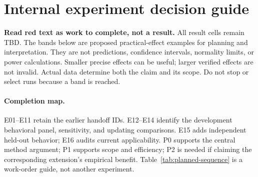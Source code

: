\begingroup
\expcolor
\raggedbottom
\section{Internal experiment decision guide}
\label{sec:experiment-decisions}
\textbf{Read red text as work to complete, not a result.}
All result cells remain TBD. The bands below are proposed practical-effect
examples for planning and interpretation. They are not predictions, confidence
intervals, normality limits, or power calculations. Smaller precise effects
can be useful; larger verified effects are not invalid. Actual data determine
both the claim and its scope. Do not stop or select runs because a band is reached.

\paragraph{Completion map.}
E01--E11 retain the earlier handoff IDs. E12--E14 identify the development
behavioral panel, sensitivity, and updating comparisons. E15 adds independent
held-out behavior; E16 audits current applicability. P0 supports the central method
argument; P1 supports scope and efficiency; P2 is needed if claiming the
corresponding extension's empirical benefit. Table~\ref{tab:planned-sequence}
is a work-order guide, not another experiment.

